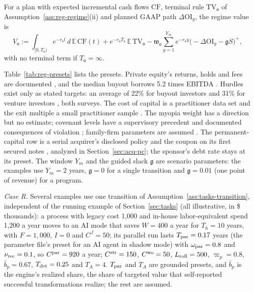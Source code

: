 \begin{definition}\label{def:reg-value}
For a plan with expected incremental cash flows $\mathrm{CF}$, terminal rule $\mathrm{TV}_{\mathsf o}$ of Assumption~\ref{ass:reg-regime}(ii) and planned GAAP path $\Delta\mathrm{OI}_y$, the regime value is
\begin{equation}\label{eq:reg-value}
V_{\mathsf o}:=\int_{[0,T_{\mathsf o})}e^{-r_{\mathsf o}t}\,d\,\mathbb E\,\mathrm{CF}(t)+e^{-r_{\mathsf o}T_{\mathsf o}}\,\mathbb E\,\mathrm{TV}_{\mathsf o}-\mathfrak w_{\mathsf o}\sum_{y=1}^{Y_m}e^{-r_{\mathsf o}y}\bigl(-\Delta\mathrm{OI}_y-\mathfrak gS\bigr)^+,
\end{equation}
with no terminal term if $T_{\mathsf o}=\infty$.
\end{definition}

Table~\ref{tab:reg-presets} lists the presets. Private equity's returns, holds and fees are documented \citep{kaplan2005private,harris2014private,kaplan2009leveraged}, and the median buyout borrows 5.2 times EBITDA \citep{axelson2013borrow}. Hurdles exist only as stated targets: an average of 22\% for buyout investors \citep{gompers2016what} and 31\% for venture investors \citep{gompers2020how}, both surveys. The cost of capital is a practitioner data set \citep{damodaran2026cost} and the exit multiple a small practitioner sample \citep{silverpeak2026software}. The myopia weight has a direction \citep{stein1989efficient,graham2005economic,asker2015corporate} but no estimate; covenant levels have a supervisory precedent and documented consequences of violation \citep{chava2008how}; family-firm parameters are assumed \citep{villalonga2006how}. The permanent-capital row is a serial acquirer's disclosed policy \citep{bendingspoons2026f1} and the coupon on its first secured notes \citep{bendingspoons2026sixk}, analyzed in Section~\ref{sec:acq-pc}; the sponsor's debt rate stays at its preset. The window $Y_m$ and the guided slack $\mathfrak g$ are scenario parameters: the examples use $Y_m=2$ years, $\mathfrak g=0$ for a single transition and $\mathfrak g=0.01$ (one point of revenue) for a program.

\emph{Case R.} Several examples use one transition of Assumption~\ref{ass:tasks-transition}, independent of the running example of Section~\ref{sec:tasks} (all illustrative, in \$ thousands): a process with legacy cost 1{,}000 and in-house labor-equivalent spend 1{,}200 a year moves to an AI mode that saves $W=400$ a year for $T_h=10$ years, with $F=1{,}000$, $I=0$ and $C^J=50$; its parallel run lasts $T_{\rm par}=0.17$ years (the parameter file's preset for an AI agent in shadow mode) with $\omega_{\rm par}=0.8$ and $\nu_{\rm rec}=0.1$, so $C^{\rm par}=920$ a year; $C^{\rm str}=150$, $C^{\rm wo}=50$, $L_{\rm roll}=500$, $\varpi_p=0.8$, $\bar b_p=0.67$, $T_{\rm det}=0.25$ and $T_A=4$. $T_{\rm par}$ and $T_A$ are grounded presets, and $\bar b_p$ is the engine's realized share, the share of targeted value that self-reported successful transformations realize; the rest are assumed.

